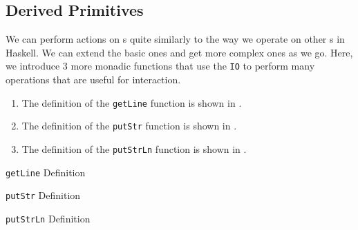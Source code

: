 \subsection{Derived Primitives}\label{subsec:Derived_Primitives}
We can perform actions on s quite similarly to the way we operate on other s in Haskell.
We can extend the basic ones and get more complex ones as we go.
Here, we introduce 3 more monadic functions that use the \texttt{IO}  to perform many operations that are useful for interaction.
\begin{enumerate}[noitemsep]
\item {}\label{act:IO_getLine}
  The definition of the \texttt{getLine} function is shown in .
\item {}\label{act:IO_putStr}
  The definition of the \texttt{putStr} function is shown in .
\item {}\label{act:putStrLn}
  The definition of the \texttt{putStrLn} function is shown in .
\end{enumerate}

\begin{listing}[h!tbp]
\caption{\texttt{getLine} Definition}
\label{lst:IO_getLine_Definition}
\end{listing}

\begin{listing}[h!tbp]
\caption{\texttt{putStr} Definition}
\label{lst:IO_putStr_Definition}
\end{listing}

\begin{listing}[h!tbp]
\caption{\texttt{putStrLn} Definition}
\label{lst:IO_putStrLn_Definition}
\end{listing}

